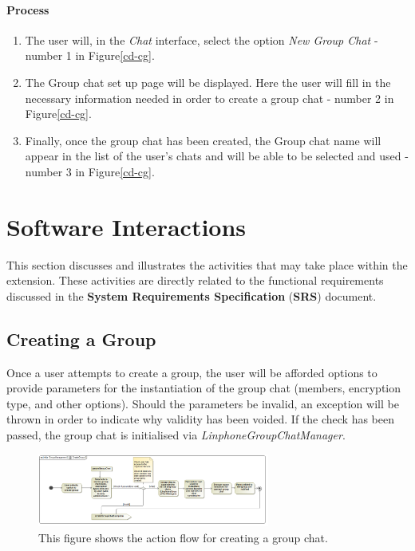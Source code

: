 \documentclass[11pt]{article}
\begin{document}
\paragraph{Process}
\begin{enumerate}
\item The user will, in the \textit{Chat} interface, select the option \textit{New Group Chat} - number 1 in Figure\ref{cd-cg}.
\item The Group chat set up page will be displayed. Here the user will fill in the necessary information needed in order to create a group chat - number 2 in Figure\ref{cd-cg}.
\item Finally, once the group chat has been created, the Group chat name will appear in the list of the user's chats and will be able to be selected and used - number 3 in Figure\ref{cd-cg}.
\end{enumerate}




\section{Software Interactions}
This section discusses and illustrates the activities that may take place within the extension. These activities are directly related to the functional requirements discussed in the \textbf{System Requirements Specification} (\textbf{SRS}) document.
\subsection{Creating a Group}
Once a user attempts to create a group, the user will be afforded options to provide parameters for the instantiation of the group chat (members, encryption type, and other options). Should the parameters be invalid, an exception will be thrown in order to indicate why validity has been voided. If the check has been passed, the group chat is initialised via \textit{LinphoneGroupChatManager}.
\begin{figure}[H]
\centering
\includegraphics[width=3in]{./images/activity_create_group.png}
\caption[Create Group Activity Diagram]{This figure shows the action flow for creating a group chat.}
\label{ad-create-group}
\end{figure}
\end{document}
